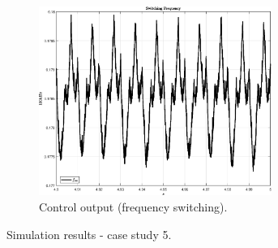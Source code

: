\documentclass[11pt,a4paper,oneside]{book}
\numberwithin{equation}{section}
\theoremstyle{it}
\theoremstyle{definition}
\begin{document}
\begin{onehalfspace}
\begin{figure}[H]
\begin{subfigure}{0.5\textwidth}
		\includegraphics[width = 215pt, angle = 0, 
		keepaspectratio]{figures/sr_without_full_load_3/without_comp_fig_5.eps}
		\captionsetup{width=0.65\textwidth, font=footnotesize}	
		\caption{Control output (frequency switching).}
		\label{}
	\end{subfigure}
	\captionsetup{width=0.5\textwidth, font=small}	
	\caption{Simulation results - case study 5.}
	\label{}
\end{figure}


\end{onehalfspace}
\end{document}
